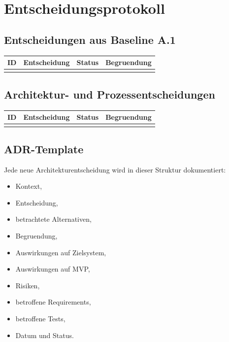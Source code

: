 \chapter{Entscheidungsprotokoll}

\section{Entscheidungen aus Baseline A.1}

\begin{longtable}{L{0.14\textwidth} L{0.42\textwidth} L{0.14\textwidth} L{0.20\textwidth}}
\toprule
ID & Entscheidung & Status & Begruendung \\
\midrule
{}
\bottomrule
\end{longtable}

\section{Architektur- und Prozessentscheidungen}

\begin{longtable}{L{0.14\textwidth} L{0.22\textwidth} L{0.22\textwidth} L{0.26\textwidth}}
\toprule
ID & Entscheidung & Status & Begruendung \\
\midrule
{}
\bottomrule
\end{longtable}

\section{ADR-Template}

Jede neue Architekturentscheidung wird in dieser Struktur dokumentiert:
\begin{itemize}
  \item Kontext,
  \item Entscheidung,
  \item betrachtete Alternativen,
  \item Begruendung,
  \item Auswirkungen auf Zielsystem,
  \item Auswirkungen auf MVP,
  \item Risiken,
  \item betroffene Requirements,
  \item betroffene Tests,
  \item Datum und Status.
\end{itemize}
